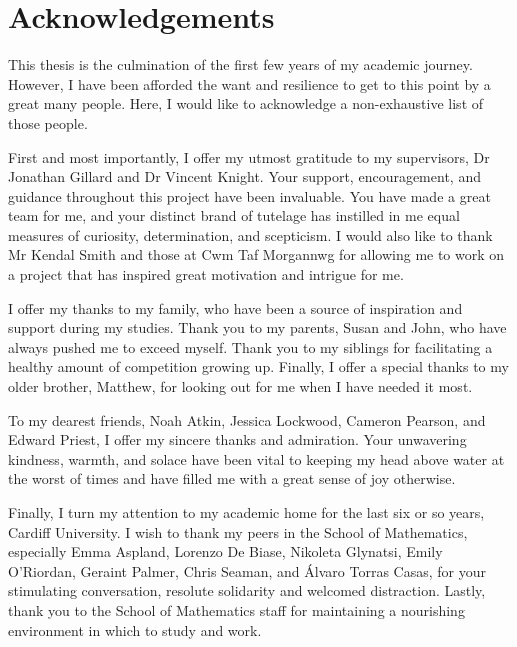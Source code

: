 \chapter*{Acknowledgements}

This thesis is the culmination of the first few years of my academic journey.
However, I have been afforded the want and resilience to get to this point by a
great many people. Here, I would like to acknowledge a non-exhaustive list of
those people.

First and most importantly, I offer my utmost gratitude to my supervisors, Dr
Jonathan Gillard and Dr Vincent Knight. Your support, encouragement, and
guidance throughout this project have been invaluable. You have made a great
team for me, and your distinct brand of tutelage has instilled in me equal
measures of curiosity, determination, and scepticism. I would also like to thank
Mr Kendal Smith and those at Cwm Taf Morgannwg for allowing me to work on a
project that has inspired great motivation and intrigue for me.

I offer my thanks to my family, who have been a source of inspiration and
support during my studies. Thank you to my parents, Susan and John, who have
always pushed me to exceed myself. Thank you to my siblings for facilitating a
healthy amount of competition growing up. Finally, I offer a special thanks to
my older brother, Matthew, for looking out for me when I have needed it most.

To my dearest friends, Noah Atkin, Jessica Lockwood, Cameron Pearson, and Edward
Priest, I offer my sincere thanks and admiration. Your unwavering kindness,
warmth, and solace have been vital to keeping my head above water at the worst
of times and have filled me with a great sense of joy otherwise.

Finally, I turn my attention to my academic home for the last six or so years,
Cardiff University. I wish to thank my peers in the School of Mathematics,
especially Emma Aspland, Lorenzo De Biase, Nikoleta Glynatsi, Emily O'Riordan,
Geraint Palmer, Chris Seaman, and \'{A}lvaro Torras Casas, for your stimulating
conversation, resolute solidarity and welcomed distraction. Lastly, thank you to
the School of Mathematics staff for maintaining a nourishing environment in
which to study and work. 
